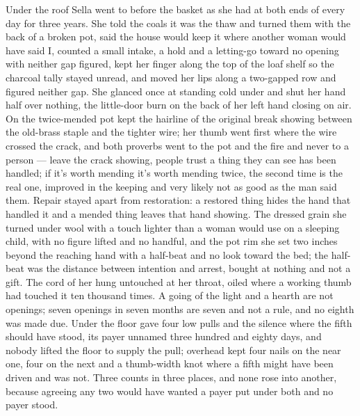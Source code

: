 Under the roof Sella went to  before the basket as she had at both ends of every day for three years. She told the coals it was the thaw and turned them with the back of a broken pot, said the house would keep it where another woman would have said I, counted a small intake, a hold and a letting-go toward no opening with neither gap figured, kept her finger along the top of the loaf shelf so the charcoal tally stayed unread, and moved her lips along a two-gapped row and figured neither gap. She glanced once at  standing cold under  and shut her hand half over nothing, the little-door burn on the back of her left hand closing on air. On  the twice-mended pot kept the hairline of the original break showing between the old-brass staple and the tighter wire; her thumb went first where the wire crossed the crack, and both proverbs went to the pot and the fire and never to a person — leave the crack showing, people trust a thing they can see has been handled; if it's worth mending it's worth mending twice, the second time is the real one, improved in the keeping and very likely not as good as the man said them. Repair stayed apart from restoration: a restored thing hides the hand that handled it and a mended thing leaves that hand showing. The dressed grain she turned under wool with a touch lighter than a woman would use on a sleeping child, with no figure lifted and no handful, and the pot rim she set two inches beyond the reaching hand with a half-beat and no look toward the bed; the half-beat was the distance between intention and arrest, bought at nothing and not a gift. The cord of her  hung untouched at her throat, oiled where a working thumb had touched it ten thousand times. A going of the light and a hearth are not openings; seven openings in seven months are seven and not a rule, and no eighth was made due. Under the floor  gave four low pulls and the silence where the fifth should have stood, its payer unnamed three hundred and eighty days, and nobody lifted the floor to supply the pull; overhead  kept four nails on the near one, four on the next and a thumb-width knot where a fifth might have been driven and was not. Three counts in three places, and none rose into another, because agreeing any two would have wanted a payer put under both and no payer stood.

\scenebreak

